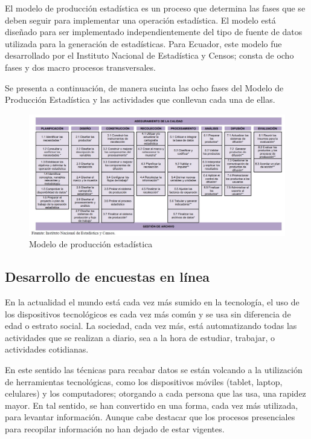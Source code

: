 \documentclass[a5paper,doc,10pt,noapacite]{apa6}
\begin{document}
{{El modelo de producción estadística es un proceso que determina las fases que se deben seguir para implementar una operación estadística. El modelo está diseñado para ser implementado independientemente del tipo de fuente de datos utilizada para la generación de estadísticas. Para Ecuador, este modelo fue desarrollado por el Instituto Nacional de Estadística y Censos; consta de ocho fases y dos macro procesos transversales.

Se presenta a continuación, de manera sucinta las ocho fases del Modelo de Producción Estadística y las actividades que conllevan cada una de ellas.

\begin{figure}[H]
	\fontsize{7}{11}\selectfont
	\captionsetup{justification=centering, labelfont=footnotesize, font=footnotesize}
\caption*{Modelo de producción estadística}
\centering
\includegraphics[scale=0.35]{Graficos/fig14_GC.jpg}
\end{figure}

\subsection{Desarrollo de encuestas en línea}
En la actualidad el mundo está cada vez más sumido en la tecnología, el uso de los dispositivos tecnológicos es cada vez más común y se usa sin diferencia de edad o estrato social. La sociedad, cada vez más, está automatizando todas las actividades que se realizan a diario, sea a la hora de estudiar, trabajar, o actividades cotidianas.

En este sentido las técnicas para recabar datos se están volcando a la utilización de herramientas tecnológicas, como los dispositivos móviles (tablet, laptop, celulares) y los computadores; otorgando a cada persona que las usa, una rapidez mayor. En tal sentido, se han convertido en una forma, cada vez más utilizada, para levantar información. Aunque cabe destacar que los procesos presenciales para recopilar información no han dejado de estar vigentes.

}}
\end{document}
